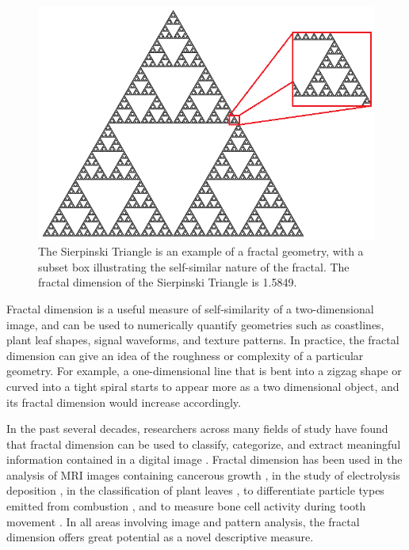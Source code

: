 \documentclass[12pt, oneside]{book}
\begin{document}
\begin{figure}[!b]
  \centering
  \includegraphics[width=\textwidth]{figures/fractal.png}
  \caption[The Sierpinski Triangle is an example of a fractal geometry, with a subset box illustrating the self-similar nature of the fractal.]{The Sierpinski Triangle is an example of a fractal geometry, with a subset box illustrating the self-similar nature of the fractal. The fractal dimension of the Sierpinski Triangle is 1.5849.}
  \label{fig:fractal}
\end{figure}

Fractal dimension is a useful measure of self-similarity of a two-dimensional image, and can be used to numerically quantify geometries such as coastlines, plant leaf shapes, signal waveforms, and texture patterns.  In practice, the fractal dimension can give an idea of the roughness or complexity of a particular geometry.  For example, a one-dimensional line that is bent into a zigzag shape or curved into a tight spiral starts to appear more as a two dimensional object, and its fractal dimension would increase accordingly.

In the past several decades, researchers across many fields of study have found that fractal dimension can be used to classify, categorize, and extract meaningful information contained in a digital image \cite{kucheryavski_extracting_2011}.  Fractal dimension has been used in the analysis of MRI images containing cancerous growth \cite{katsikis_fractal_2012}, in the study of electrolysis deposition \cite{nakouzi_fractal_2011}, in the classification of plant leaves \cite{du_recognition_2013}, to differentiate particle types emitted from combustion \cite{arora_morphological_2015}, and to measure bone cell activity during tooth movement \cite{adriele_silveira_new_2015}.  In all areas involving image and pattern analysis, the fractal dimension offers great potential as a novel descriptive measure.
\end{document}
